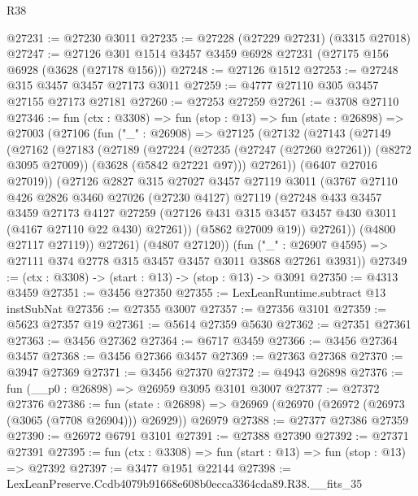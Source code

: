 \begin{lexlean}{R38}
\begin{coremodule}
@27231 := @27230 @3011
@27235 := @27228 (@27229 @27231) (@3315 @27018)
@27247 := @27126 @301 @1514 @3457 @3459 @6928 @27231 (@27175 @156 @6928 (@3628 (@27178 @156)))
@27248 := @27126 @1512
@27253 := @27248 @315 @3457 @3457 @27173 @3011
@27259 := @4777 @27110 @305 @3457 @27155 @27173 @27181
@27260 := @27253 @27259
@27261 := @3708 @27110
@27346 := fun (ctx : @3308) =>
  fun (stop : @13) =>
  fun (state : @26898) =>
  @27003
    (@27106
      (fun ("_" : @26908) =>
      @27125
        (@27132
          (@27143
            (@27149
              (@27162
                (@27183
                  (@27189
                    (@27224
                      (@27235 (@27247 (@27260 @27261)) (@8272 @3095 @27009))
                      (@3628 (@5842 @27221 @97)))
                    @27261))
                (@6407 @27016 @27019))
              (@27126
                @2827
                @315
                @27027
                @3457
                @27119
                @3011
                (@3767
                  @27110
                  @426
                  @2826
                  @3460
                  @27026
                  (@27230 @4127)
                  @27119
                  (@27248
                    @433
                    @3457
                    @3459
                    @27173
                    @4127
                    @27259
                    (@27126 @431 @315 @3457 @3457 @430 @3011 (@4167 @27110 @22 @430) @27261))
                  (@5862 @27009 @19))
                @27261))
            (@4800 @27117 @27119))
          @27261)
        (@4807 @27120))
      (fun ("_" : @26907 @4595) => @27111 @374 @2778 @315 @3457 @3457 @3011 @3868 @27261 @3931))
@27349 := (ctx : @3308) -> (start : @13) -> (stop : @13) -> @3091
@27350 := @4313 @3459
@27351 := @3456 @27350
@27355 := LexLeanRuntime.subtract @13 instSubNat
@27356 := @27355 @3007
@27357 := @27356 @3101
@27359 := @5623 @27357 @19
@27361 := @5614 @27359 @5630
@27362 := @27351 @27361
@27363 := @3456 @27362
@27364 := @6717 @3459
@27366 := @3456 @27364 @3457
@27368 := @3456 @27366 @3457
@27369 := @27363 @27368
@27370 := @3947 @27369
@27371 := @3456 @27370
@27372 := @4943 @26898
@27376 := fun (__p0 : @26898) => @26959 @3095 @3101 @3007
@27377 := @27372 @27376
@27386 := fun (state : @26898) =>
  @26969 (@26970 (@26972 (@26973 (@3065 (@7708 @26904))) @26929)) @26979
@27388 := @27377 @27386 @27359
@27390 := @26972 @6791 @3101
@27391 := @27388 @27390
@27392 := @27371 @27391
@27395 := fun (ctx : @3308) => fun (start : @13) => fun (stop : @13) => @27392
@27397 := @3477 @1951 @22144
@27398 := LexLeanPreserve.Ccdb4079b91668e608b0ecca3364cda89.R38.__fits_35

\end{coremodule}
\end{lexlean}
